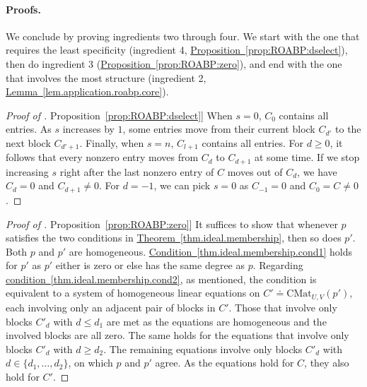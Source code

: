 \documentclass[11pt]{article}
\numberwithin{equation}{section}
\theoremstyle{definition}
\theoremstyle{plain}
\newcommand{\expref}[2]{\hyperref[#2]{#1~\ref{#2}}}
\newcommand{\CMat}[2]{\mathrm{CMat}_{#1,#2}}
\begin{document}
\paragraph{Proofs.}
We conclude by proving ingredients two through four.
We start with the one that requires the least specificity (ingredient 4, \expref{Proposition}{prop:ROABP:dselect}), then do ingredient 3 (\expref{Proposition}{prop:ROABP:zero}), and end with the one that involves the most structure (ingredient 2, \expref{Lemma}{lem.application.roabp.core}).

\begin{proof}[Proof of \expref{Proposition}{prop:ROABP:dselect}]
  When $s=0$, $C_0$ contains all entries. 
  As $s$ increases by $1$,
  some entries move from their current block $C_{d'}$ to the next block
  $C_{d'+1}$.
  Finally, when $s=n$, $C_{l+1}$ contains all entries.
  For $d \ge 0$, it follows that every nonzero entry moves from $C_d$ to $C_{d+1}$ at some time. If we stop increasing $s$ right after the last nonzero entry of $C$ moves
  out of \(C_d\), we have $C_d=0$ and $C_{d+1} \ne 0$. For $d=-1$, we can pick $s=0$ as $C_{-1}=0$ and $C_0=C \ne 0$. 
\end{proof}

\begin{proof}[Proof of \expref{Proposition}{prop:ROABP:zero}]
  It suffices to show that whenever $p$ satisfies the two conditions in
  \expref{Theorem}{thm.ideal.membership}, then so does $p'$. Both $p$ and $p'$ are homogeneous. 
  \expref{Condition}{thm.ideal.membership.cond1} holds for $p'$ as
  \(p'\) either is zero or else has the same degree as \(p\).
  Regarding \expref{condition}{thm.ideal.membership.cond2}, as
  mentioned, the condition is equivalent to a system of homogeneous
  linear equations on \(C' \doteq \CMat{U}{V}(p')\), each involving
  only an adjacent pair of blocks in $C'$.
  Those that involve only blocks $C'_d$ with $d \le d_1$ are met as the
  equations are homogeneous and the involved blocks are all zero.
  The same holds for the equations that involve only blocks $C'_d$
  with $d \ge d_2$.
  The remaining equations involve only blocks $C'_d$ with
  $d \in \{d_1, \dots, d_2\}$,
  on which $p$ and $p'$ agree.
  As the equations hold for \(C\), they also hold for $C'$.
\end{proof}
\end{document}
